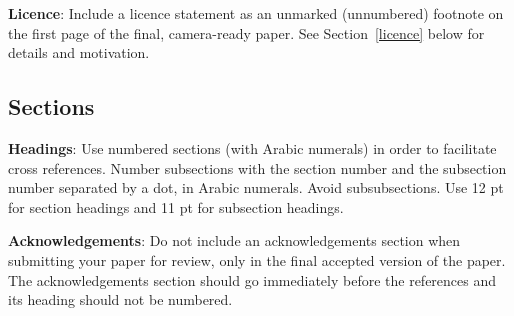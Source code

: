 \documentclass{clarin}
\begin{document}
{\bf Licence}: Include a licence statement as an unmarked (unnumbered)
footnote on the first page of the final, camera-ready paper.
See Section~\ref{licence} below for details and motivation.


\subsection{Sections}

{\bf Headings}: Use numbered sections (with Arabic
numerals) in order to facilitate cross references. Number subsections
with the section number and the subsection number separated by a dot,
in Arabic numerals. Avoid subsubsections.  Use 12 pt for section headings and 11 pt for subsection headings.

{\bf Acknowledgements}: Do not include an acknowledgements section
when submitting your paper for review, only in the final accepted version of the paper.
The acknowledgements section should go immediately before the references and its heading should not be numbered.
\end{document}
